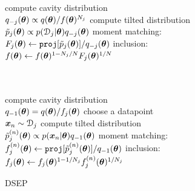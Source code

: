 \begin{figure}[t]
\begin{minipage}[t]{0.32\linewidth}
\begin{algorithm}[H]
\begin{algorithmic}[1]
	\STATE compute cavity distribution \\ $q_{-j}(\bm{\theta}) \propto q(\bm{\theta}) / f(\bm{\theta})^{N_j}$
	\STATE compute tilted distribution \\$\tilde{p}_j(\bm{\theta}) \propto p(\mathcal{D}_j|\bm{\theta}) q_{-j}(\bm{\theta})$
	\STATE moment matching: \\\hspace{-6mm}$F_j(\bm{\theta}) \leftarrow \mathtt{proj}[\tilde{p}_j(\bm{\theta})] / q_{-j}(\bm{\theta}) $
	\STATE inclusion:\\\hspace{-6mm}$f(\bm{\theta}) \leftarrow f(\bm{\theta})^{1 - N_j / N} F_j(\bm{\theta})^{1/N}$ \\
\hspace{1mm}\\ \vspace{2.7mm} \hspace{1mm}\\
\end{algorithmic}
\end{algorithm}
\end{minipage} 
%
\begin{minipage}[t]{0.33\linewidth}
\centering
\begin{algorithm}[H] 
\caption{DSEP} \small
\label{alg:dsep} 
\begin{algorithmic}[1] 
	\STATE compute cavity distribution \\$q_{-1}(\bm{\theta}) = q(\bm{\theta}) / f_j(\bm{\theta})$
	\STATE choose a datapoint \\ $\bm{x}_n \sim \mathcal{D}_j$
	\STATE compute tilted distribution \\$\tilde{p}_j^{(n)}(\bm{\theta}) \propto p(\bm{x}_n|\bm{\theta}) q_{-1}(\bm{\theta})$
	\STATE moment matching: \\\hspace{-9mm}$f_j^{(n)}(\bm{\theta}) \leftarrow \mathtt{proj}[\tilde{p}_j^{(n)}(\bm{\theta})] / q_{-1}(\bm{\theta})$
	\STATE inclusion:\\\hspace{-8mm} $f_j(\bm{\theta}) \leftarrow f_j(\bm{\theta})^{1 - 1/N_j} f_j^{(n)}(\bm{\theta})^{1/N_j}$
\end{algorithmic}
\end{algorithm}
\end{minipage}
%
\end{figure}
%
